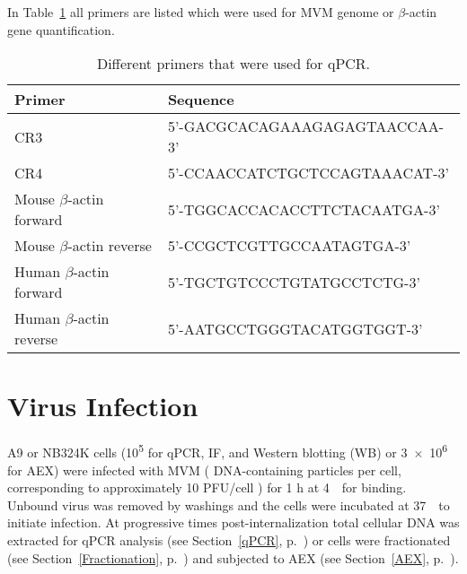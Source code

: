 In Table~\ref{Primers} all primers are listed which were used for MVM genome or $\beta$-actin gene quantification. 
\bigskip
\begin{table}[H]
\begin{center}
\caption[Primers]{Different primers that were used for qPCR.}
\vspace{.5cm}
\hspace{2.3cm}\begin{tabular}{l l}
\hline
\label{Primers}
\textbf{Primer} & \textbf{Sequence}\Tstrut\Bstrut\\
\hline
CR3 & 5'-GACGCACAGAAAGAGAGTAACCAA-3'\\
CR4 & 5'-CCAACCATCTGCTCCAGTAAACAT-3'\\
Mouse $\beta$-actin forward & 5'-TGGCACCACACCTTCTACAATGA-3' \\
Mouse $\beta$-actin reverse & 5'-CCGCTCGTTGCCAATAGTGA-3' \\
Human $\beta$-actin forward & 5'-TGCTGTCCCTGTATGCCTCTG-3' \\
Human $\beta$-actin reverse & 5'-AATGCCTGGGTACATGGTGGT-3' \\[1.1ex]
\hline
\end{tabular} 
\end{center} 
\end{table}


\section{Virus Infection} 

A9 or NB324K cells (10\textsuperscript{5} for qPCR, IF, and Western blotting (WB) or 3~$\times$~10\textsuperscript{6} for AEX) were infected with MVM ( DNA-containing particles per cell, corresponding to approximately 10 PFU/cell \cite{pmid4673484}) for 1 h at 4~\textcelsius~for binding. Unbound virus was removed by washings and the cells were incubated at 37~\textcelsius~to initiate infection. At progressive times post-internalization total cellular DNA was extracted for qPCR analysis (see Section~\ref{qPCR}, p.~\pageref{qPCR}) or cells were fractionated (see Section~\ref{Fractionation}, p.~\pageref{Fractionation}) and subjected to AEX (see Section~\ref{AEX}, p.~\pageref{AEX}).    


\clearpage
